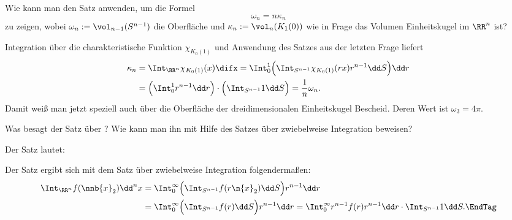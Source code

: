 \begin{frage}
  Wie kann man den Satz anwenden, um die Formel 
  \[
  \boxed{ 
    \omega_n = n \kappa_n
  }
  \]
  zu zeigen, wobei $\omega_n:=\vol_{n-1}(S^{n-1})$ die Oberfläche und 
  $\kappa_n := \vol_n ( K_1(0) )$ 
  wie in Frage das Volumen Einheitskugel im $\RR^n$ ist?
\end{frage}

\begin{antwort}
  Integration über die charakteristische Funktion $\chi_{K_0(1)}$ und 
  Anwendung des Satzes aus der letzten Frage liefert
  \begin{align}
    \kappa_n &= \Int_{\RR^n} \chi_{K_0(1)} (x) \difx = 
    \Int_0^1 \Big(\Int_{S^{n-1}}  \chi_{K_0(1)}(rx) r^{n-1} \dd S \Big) \dd r 
    \notag
    \\
    &= \Big( \Int_0^1 r^{n-1} \dd r\Big) \cdot \Big(\Int_{S^{n-1}} 1 \dd S \Big)=
    \frac{1}{n} \omega_n. \notag
  \end{align}
  Damit weiß man jetzt speziell auch über die Oberfläche der dreidimensionalen 
  Einheitskugel Bescheid. Deren Wert ist $\omega_3 = 4\pi$. \AntEnd
\end{antwort}

\begin{frage}\label{11_rot}
  Was besagt der Satz über ? 
  Wie kann man ihn mit Hilfe des Satzes über zwiebelweise Integration beweisen?
\end{frage}

\begin{antwort}
  Der Satz lautet:  
  
  \noindent
  Der Satz ergibt sich mit dem Satz über zwiebelweise Integration 
  folgendermaßen:  
  \begin{align}
    \Int_{\RR^n} f( \nnb{x}_2 ) \dd^n x &= 
    \Int_0^\infty 
    \Big( \Int_{S^{n-1}} f( r \n{x}_2 ) \dd S \Big) r^{n-1}\dd r \notag
    \\ 
    &=\Int_0^\infty 
    \Big( \Int_{S^{n-1}} f( r )  \dd S \Big) r^{n-1}\dd r =
    \Int_0^\infty r^{n-1} f( r )r^{n-1} \dd r \cdot 
    \Int_{S^{n-1}}  1 \dd S.
    \EndTag
  \end{align}
\end{antwort} 





